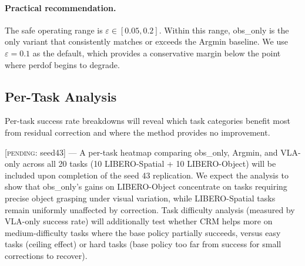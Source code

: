\paragraph{Practical recommendation.}
The safe operating range is $\varepsilon \in [0.05, 0.2]$.
Within this range, obs\_only is the only variant that consistently matches or exceeds the Argmin baseline.
We use $\varepsilon{=}0.1$ as the default, which provides a conservative margin below the point where perdof begins to degrade.


\subsection{Per-Task Analysis}
\label{sec:per_task}

Per-task success rate breakdowns will reveal which task categories benefit most from residual correction and where the method provides no improvement.

[\textsc{pending}: seed43] --- A per-task heatmap comparing obs\_only, Argmin, and VLA-only across all 20 tasks (10 LIBERO-Spatial + 10 LIBERO-Object) will be included upon completion of the seed 43 replication.
We expect the analysis to show that obs\_only's gains on LIBERO-Object concentrate on tasks requiring precise object grasping under visual variation, while LIBERO-Spatial tasks remain uniformly unaffected by correction.
Task difficulty analysis (measured by VLA-only success rate) will additionally test whether CRM helps more on medium-difficulty tasks where the base policy partially succeeds, versus easy tasks (ceiling effect) or hard tasks (base policy too far from success for small corrections to recover).
